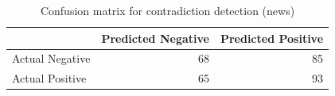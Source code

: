 \begin{table}
\caption{Confusion matrix for contradiction detection (news)}
\label{tab:confusion_matrix}
\begin{tabular}{lrr}
\toprule
 & Predicted Negative & Predicted Positive \\
\midrule
Actual Negative & 68 & 85 \\
Actual Positive & 65 & 93 \\
\bottomrule
\end{tabular}
\end{table}
